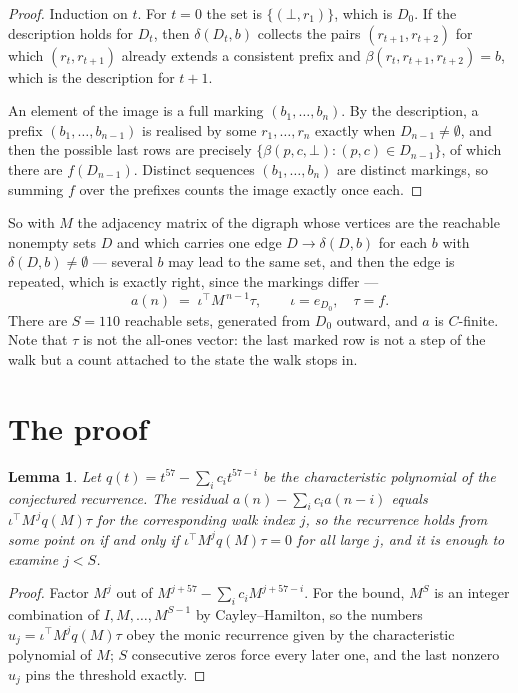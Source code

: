 \documentclass[11pt,a4paper]{article}
\theoremstyle{plain}
\newtheorem{lemma}[theorem]{Lemma}
\theoremstyle{definition}
\begin{document}
\begin{proof}
Induction on $t$. For $t=0$ the set is $\{(\bot,r_1)\}$, which is $D_0$. If the description
holds for $D_t$, then $\delta(D_t,b)$ collects the pairs $(r_{t+1},r_{t+2})$ for which
$(r_t,r_{t+1})$ already extends a consistent prefix and
$\beta(r_t,r_{t+1},r_{t+2})=b$, which is the description for $t+1$.

An element of the image is a full marking $(b_1,\dots,b_n)$. By the description, a prefix
$(b_1,\dots,b_{n-1})$ is realised by some $r_1,\dots,r_n$ exactly when $D_{n-1}\neq
\emptyset$, and then the possible last rows are precisely
$\{\beta(p,c,\bot):(p,c)\in D_{n-1}\}$, of which there are $f(D_{n-1})$. Distinct
sequences $(b_1,\dots,b_n)$ are distinct markings, so summing $f$ over the prefixes counts the
image exactly once each.
\end{proof}

So with $M$ the adjacency matrix of the digraph whose vertices are the reachable nonempty sets
$D$ and which carries one edge $D\to\delta(D,b)$ for each $b$ with $\delta(D,b)\neq\emptyset$
--- several $b$ may lead to the same set, and then the edge is repeated, which is exactly
right, since the markings differ ---
\[
a(n)\;=\;\iota^{\!\top}M^{\,n-1}\tau,\qquad \iota=e_{D_0},\quad \tau=f .
\]
There are $S=110$ reachable sets, generated from $D_0$ outward, and $a$ is $C$-finite. Note
that $\tau$ is not the all-ones vector: the last marked row is not a step of the walk but a
count attached to the state the walk stops in.

\section{The proof}

\begin{lemma}\label{lem:crit}
Let $q(t)=t^{57}-\sum_i c_it^{57-i}$ be the characteristic polynomial of the
conjectured recurrence. The residual $a(n)-\sum_ic_ia(n-i)$ equals
$\iota^{\!\top}M^{\,j}q(M)\tau$ for the corresponding walk index $j$, so the recurrence
holds from some point on if and only if $\iota^{\!\top}M^{j}q(M)\tau=0$ for all large $j$,
and it is enough to examine $j<S$.
\end{lemma}

\begin{proof}
Factor $M^{j}$ out of $M^{j+57}-\sum_ic_iM^{j+57-i}$. For the bound, $M^{S}$
is an integer combination of $I,M,\dots,M^{S-1}$ by Cayley--Hamilton, so the numbers
$u_j=\iota^{\!\top}M^{j}q(M)\tau$ obey the monic recurrence given by the characteristic
polynomial of $M$; $S$ consecutive zeros force every later one, and the last nonzero $u_j$
pins the threshold exactly.
\end{proof}
\end{document}

